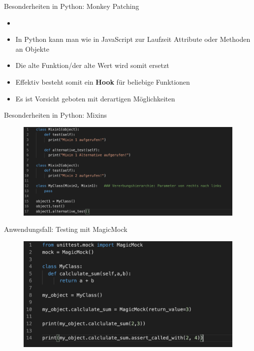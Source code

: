   
\begin{frame}{Besonderheiten in Python: Monkey Patching }
  \begin{itemize}
        \setlength{\itemindent}{1.1in}
        \item [\textbf{Monkey Patching}]
    \end{itemize}

    \begin{itemize}
        \item In Python kann man wie in JavaScript zur Laufzeit Attribute oder Methoden an Objekte   
        \item Die alte Funktion/der alte Wert wird somit ersetzt
        \item Effektiv besteht somit ein \textbf{Hook} für beliebige Funktionen
        \item Es ist Vorsicht geboten mit derartigen Möglichkeiten
    \end{itemize}

  \end{frame}
  
 
\begin{frame}{Besonderheiten in Python: Mixins}
   \begin{figure}[!htb]
        \includegraphics[scale=0.37]{6-python3/img/mixins}  %
    \end{figure}
   
  \end{frame}
       

\begin{frame}{Anwendungsfall: Testing mit MagicMock}
   \begin{figure}[!htb]
        \includegraphics[scale=0.47]{6-python3/img/magicmock}  %
    \end{figure}
   
\end{frame}

